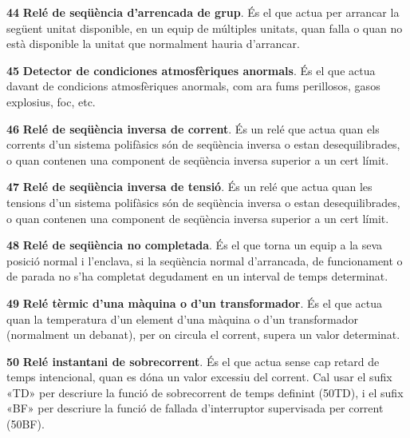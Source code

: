 \begin{multicols}{2}
\begin{list}{}
\item[\textbf{44}]   
\textbf{Relé de seqüència
d'arrencada de grup}. És el que actua per arrancar la següent unitat
disponible, en un equip de múltiples unitats, quan falla o quan no
està disponible la unitat que normalment hauria d'arrancar.

\item[\textbf{45}]   
\textbf{Detector de condiciones
atmosfèriques anormals}. És el que actua davant de condicions atmosfèriques anormals, com ara fums
perillosos, gasos explosius, foc, etc.

\item[\textbf{46}]   
\textbf{Relé de
seqüència inversa de corrent}. És un relé que actua quan els corrents
 d'un sistema polifàsics són de seqüència inversa o estan
desequilibrades, o quan contenen una component de seqüència inversa
superior a un cert límit.

\item[\textbf{47}]   
\textbf{Relé
de seqüència inversa de tensió}. És un relé que actua quan les
tensions d'un sistema polifàsics són de seqüència inversa o estan
desequilibrades, o quan contenen una component de seqüència inversa
superior a un cert límit.

\item[\textbf{48}]   
\textbf{Relé de seqüència
no completada}. És el que torna un equip a la seva posició normal  i
l'enclava, si la seqüència normal d'arrancada, de funcionament o de
parada no s'ha completat degudament en un interval de temps
determinat.

\item[\textbf{49}]  
\textbf{Relé tèrmic d'una màquina o d'un transformador}. És el que
actua quan la temperatura d'un element d'una màquina o d'un
transformador (normalment un debanat), per on circula el corrent,
supera un valor determinat.

\item[\textbf{50}]   
\textbf{Relé instantani de sobrecorrent}. És el que actua sense cap retard de temps intencional, quan es dóna un valor excessiu del
corrent. Cal usar el sufix «TD» per descriure la funció de sobrecorrent de temps definint (50TD), i el sufix «BF» per descriure la funció de fallada d'interruptor supervisada per corrent (50BF).


\end{list}
\end{multicols}
